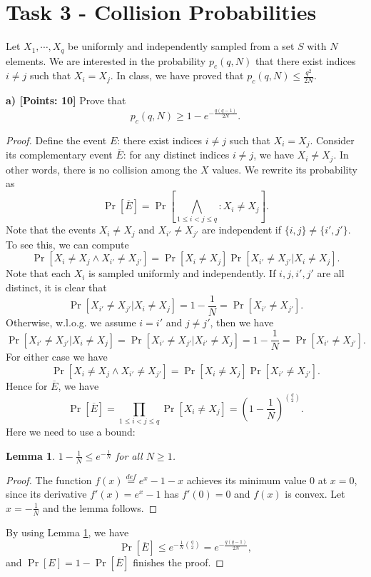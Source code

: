 \documentclass[12pt]{article}
\newcommand{\eqdef}{\stackrel{def}{=}}
\newtheorem{lemma}[theorem]{Lemma}
\theoremstyle{definition}
\begin{document}
\section{Task 3 - Collision Probabilities}
Let $X_1, \cdots, X_q$ be uniformly and independently sampled from a set $S$ with $N$ elements. We are interested in the probability $p_c(q, N)$ that there exist indices $i \not = j$ such that $X_i = X_j$. In class, we have proved that $p_c(q, N) \leq \frac{q^2}{2N}$.

{\bf a) [Points: 10]} Prove that
$$p_c(q, N) \geq 1-e^{-\frac{q(q-1)}{2N}}.$$
\begin{proof}
Define the event $E$: there exist indices $i \not = j$ such that $X_i = X_j$. 
Consider its complementary event $\overline{E}$: for any distinct indices $i \not= j$, we have $X_i \not= X_j$. In other words, there is no collision among the $X$ values. We rewrite its probability as
$$\Pr[\overline{E}] = \Pr[\bigwedge_{1\leq i < j \leq q} : X_i \not = X_j].$$
Note that the events $X_i \not = X_j$ and $X_{i'} \not = X_{j'}$ are independent if $\{i,j\} \not= \{i',j'\}$. To see this, we can compute
$$\Pr[X_i \not = X_j \wedge X_{i'} \not = X_{j'}] = \Pr[X_i \not = X_j]\Pr[X_{i'} \not = X_{j'} | X_i \not = X_j].$$
Note that each $X_i$ is sampled uniformly and independently. If $i, j, i', j'$ are all distinct, it is clear that
$$\Pr[X_{i'} \not = X_{j'} | X_i \not = X_j] = 1-\frac{1}{N} = \Pr[X_{i'} \not = X_{j'} ].$$
Otherwise, w.l.o.g. we assume $i=i'$ and $j \not= j'$, then we have
$$\Pr[X_{i'} \not = X_{j'} | X_i \not = X_j] = \Pr[X_{i'} \not = X_{j'} | X_{i'} \not = X_j] = 1-\frac{1}{N} = \Pr[X_{i'} \not = X_{j'} ].$$
For either case we have
$$\Pr[X_i \not = X_j \wedge X_{i'} \not = X_{j'}] = \Pr[X_i \not = X_j]\Pr[X_{i'} \not = X_{j'}].$$
Hence for $\overline{E}$, we have
$$\Pr[\overline{E}] = \prod_{1\leq i < j \leq q}\Pr[X_i \not = X_j] = \left( 1 - \frac{1}{N} \right)^{\binom{q}{2}}.$$
Here we need to use a bound:
\begin{lemma}
\label{lem:1}
$1-\frac{1}{N} \leq e^{-\frac{1}{N}}$ for all $N\geq 1$.
\end{lemma}
\begin{proof}
The function $f(x) \eqdef e^x-1-x$ achieves its minimum value 0 at $x=0$, since its derivative $f'(x) = e^x-1$ has $f'(0)=0$ and $f(x)$ is convex. Let $x=-\frac{1}{N}$ and the lemma follows.
\end{proof}
By using Lemma \ref{lem:1}, we have
$$\Pr[\overline{E}] \leq e^{-\frac{1}{N}\binom{q}{2}} = e^{-\frac{q(q-1)}{2N}},$$
and $\Pr[E] = 1-\Pr[\overline{E}]$ finishes the proof.
\end{proof}
\end{document}
